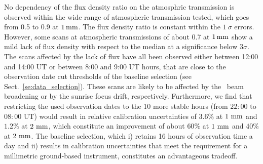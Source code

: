 No dependency of the flux density ratio on the atmosphric transmission
is observed within the wide range of atmospheric transmission tested,
which goes from 0.5 to 0.9 at $1\,\rm{mm}$. The flux
density ratio is constant within the $1~\sigma$ errors. However, some scans at atmospheric
transmissions of about 0.7 at $1\,\rm{mm}$ show a mild lack
of flux density with respect to the median at a significance below
$3\sigma$. The scans affected by the lack of flux have all been observed 
either between 12:00 and 14:00 UT or between 8:00 and 9:00 UT hours,
that are close to the observation date cut thresholds of the baseline
selection (see Sect.~\ref{se:data_selection}). These scans are likely
to be affected by the \afternoon\ beam broadening or by the
sunrise focus drift, respectively. Furthermore, we find that restricting the
used observation dates to the 10 more stable hours (from $22:00$ to
$08:00$ UT) would result in relative calibration uncertainties of
$3.6\%$ at $1~\rm{mm}$ and $1.2\%$ at $2~\rm{mm}$, which constitute an
improvement of about $60\%$ at $1~\rm{mm}$ and $40\%$ at
$2~\rm{mm}$.  
The baseline selection, which i) retains 16 hours of observation time
a day and ii) results in calibration uncertainties that meet the
requirement for a millimetric ground-based instrument, constitutes an
advantageous tradeoff.  


